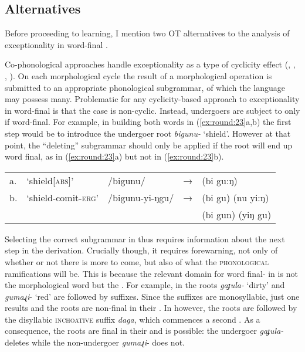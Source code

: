 \documentclass[output=paper,
modfonts
]{LSP/langsci}
\begin{document}
\subsection[Alternatives]{Alternatives}

Before proceeding to learning, I mention two OT alternatives to the analysis of exceptionality in  word-final .

Co-phonological approaches handle exceptionality as a type of cyclicity effect (\citealt{orgun1996}, \citealt{kiparsky2000r}, \citealt{inkelas2007}, \citealt{bermudez-Otero2016}). On each morphological cycle the result of a morphological operation is submitted to an appropriate phonological subgrammar, of which the language may possess many. Problematic for any cyclicity-based approach to exceptionality in  word-final  is that the  case is non-cyclic. Instead, undergoers are subject to  only if word-final. For example, in building both words in (\ref{ex:round:23}a,b) the first step would be to introduce the undergoer root \textit{bigunu-} `shield'. However at that point, the ``deleting'' subgrammar should only be applied if the root will end up word final, as in (\ref{ex:round:23}a) but not in (\ref{ex:round:23}b). 

\ea \label{ex:round:23}
\begin{tabular}[t]{@{}lllll}
a.& `shield\textsc{[abs]}' & /bigunu/ & → & (bi gu:ŋ) \\
b.& `shield-comit-\textsc{erg}' & /bigunu-yi-ŋgu/ & → & (bi gu) (nu yi:ŋ) \\
& & & &  \ljudge{*}(bi gun) (yiŋ gu) \\
\end{tabular}
\z 

Selecting the correct subgrammar in  thus requires information about the next step in the derivation. Crucially though, it requires forewarning, not only of whether or not there is more  to come, but also of what the \textsc{phonological} ramifications will be. This is because the relevant domain for word final- in  is not the morphological word but the . For example, in  the roots \textit{gaɟula-} `dirty' and \textit{gumaɻi}{}- `red' are followed by suffixes. Since the suffixes are monosyllabic, just one  results and the roots are non-final in their . In  however, the roots are followed by the disyllabic \textsc{inchoative} suffix \textit{daga}, which commences a second . As a consequence, the roots are final in their  and  is possible: the undergoer \textit{gaɟula-} deletes while the non-undergoer \textit{gumaɻi}- does not.
\end{document}
